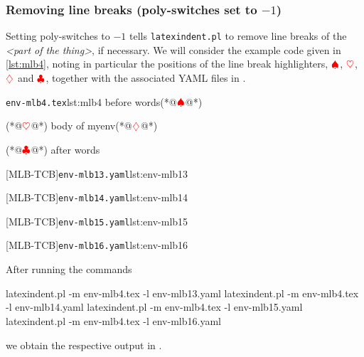 \subsubsection{Removing line breaks (poly-switches set to $-1$)}
	Setting poly-switches to $-1$ tells \texttt{latexindent.pl} to remove line breaks of the \emph{<part of the thing>}, if necessary. We will consider the
	example code given in \cref{lst:mlb4}, noting in particular the positions of
	the line break highlighters, $\color{red}\spadesuit$, $\color{red}\heartsuit$, $\color{red}\diamondsuit$
	and $\color{red}\clubsuit$, together with the associated YAML files in .

	\begin{minipage}{.45\linewidth}
		\begin{cmhlistings}[escapeinside={(*@}{@*)}]{\texttt{env-mlb4.tex}}{lst:mlb4}
before words(*@$\color{red}\spadesuit$@*)
\begin{myenv}(*@$\color{red}\heartsuit$@*)
body of myenv(*@$\color{red}\diamondsuit$@*)
\end{myenv}(*@$\color{red}\clubsuit$@*)
after words
\end{cmhlistings}
	\end{minipage}%
	\hfill
	\begin{minipage}{.51\textwidth}
		[MLB-TCB]{\texttt{env-mlb13.yaml}}{lst:env-mlb13}

		[MLB-TCB]{\texttt{env-mlb14.yaml}}{lst:env-mlb14}

		[MLB-TCB]{\texttt{env-mlb15.yaml}}{lst:env-mlb15}

		[MLB-TCB]{\texttt{env-mlb16.yaml}}{lst:env-mlb16}
	\end{minipage}

	After running the commands
	\begin{commandshell}
latexindent.pl -m env-mlb4.tex -l env-mlb13.yaml
latexindent.pl -m env-mlb4.tex -l env-mlb14.yaml
latexindent.pl -m env-mlb4.tex -l env-mlb15.yaml
latexindent.pl -m env-mlb4.tex -l env-mlb16.yaml
\end{commandshell}

	we obtain the respective output in .

	\begin{minipage}{.45\linewidth}
	\end{minipage}
	\hfill
	\begin{minipage}{.45\linewidth}
	\end{minipage}

